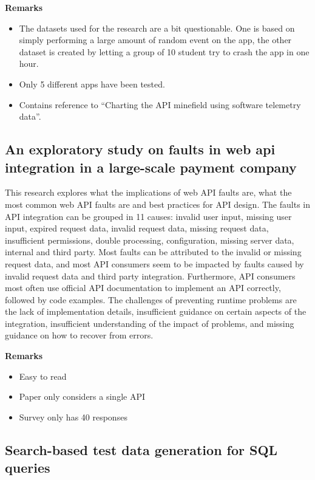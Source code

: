 \documentclass[]{book}
\providecommand{\tightlist}{%
  \setlength{\itemsep}{0pt}\setlength{\parskip}{0pt}}
\begin{document}
\textbf{Remarks}

\begin{itemize}
\tightlist
\item
  The datasets used for the research are a bit questionable. One is
  based on simply performing a large amount of random event on the app,
  the other dataset is created by letting a group of 10 student try to
  crash the app in one hour.
\item
  Only 5 different apps have been tested.
\item
  Contains reference to ``Charting the API minefield using software
  telemetry data''.
\end{itemize}

\subsection{An exploratory study on faults in web api integration in a
large-scale payment
company}\label{an-exploratory-study-on-faults-in-web-api-integration-in-a-large-scale-payment-company}

This research explores what the implications of web API faults are, what
the most common web API faults are and best practices for API design.
The faults in API integration can be grouped in 11 causes: invalid user
input, missing user input, expired request data, invalid request data,
missing request data, insufficient permissions, double processing,
configuration, missing server data, internal and third party. Most
faults can be attributed to the invalid or missing request data, and
most API consumers seem to be impacted by faults caused by invalid
request data and third party integration. Furthermore, API consumers
most often use official API documentation to implement an API correctly,
followed by code examples. The challenges of preventing runtime problems
are the lack of implementation details, insufficient guidance on certain
aspects of the integration, insufficient understanding of the impact of
problems, and missing guidance on how to recover from errors.

\textbf{Remarks}

\begin{itemize}
\tightlist
\item
  Easy to read
\item
  Paper only considers a single API
\item
  Survey only has 40 responses
\end{itemize}

\subsection{Search-based test data generation for SQL
queries}\label{search-based-test-data-generation-for-sql-queries}
\end{document}
